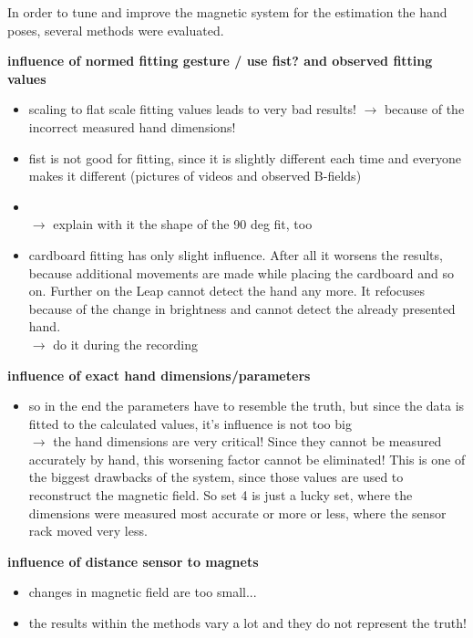 In order to tune and improve the magnetic system for the estimation the hand poses, several methods were evaluated. 

\textbf{influence of normed fitting gesture / use fist? and observed fitting values}
	\begin{itemize}
	\item scaling to flat scale fitting values leads to very bad results! $ \rightarrow $ because of the incorrect measured hand dimensions!
	\item fist is not good for fitting, since it is slightly different each time and everyone makes it different (pictures of videos and observed B-fields)
	\item {} \\
	$ \rightarrow $ explain with it the shape of the 90 deg fit, too
	\item cardboard fitting has only slight influence. After all it worsens the results, because additional movements are made while placing the cardboard and so on. Further on the Leap cannot detect the hand any more. It refocuses because of the change in brightness and cannot detect the already presented hand. \\
	$ \rightarrow $ do it during the recording
	 
	\end{itemize}


\textbf{influence of exact hand dimensions/parameters}
	\begin{itemize}
	\item so in the end the parameters have to resemble the truth, but since the data is fitted to the calculated values, it's influence is not too big \\
		$ \rightarrow $ the hand dimensions are very critical! Since they cannot be measured accurately by hand, this worsening factor cannot be eliminated! This is one of the biggest drawbacks of the system, since those values are used to reconstruct the magnetic field. So set 4 is just a lucky set, where the dimensions were measured most accurate or more or less, where the sensor rack moved very less.  
		
	\end{itemize}

\textbf{influence of distance sensor to magnets}
	\begin{itemize}
	\item changes in magnetic field are too small...	
	\item the results within the methods vary a lot and they do not represent the truth!
	\end{itemize}

